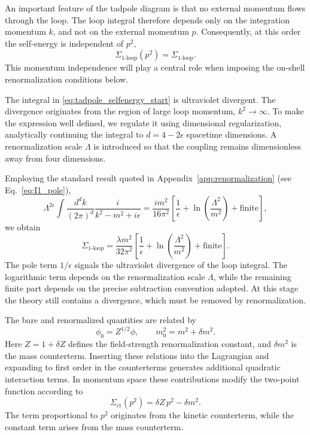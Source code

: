 An important feature of the tadpole diagram is that no external
momentum flows through the loop.
The loop integral therefore depends only on the integration momentum $k$,
and not on the external momentum $p$.
Consequently, at this order the self-energy is independent of $p^2$,
\begin{equation}
\Sigma_{\text{1-loop}}(p^2) = \Sigma_{\text{1-loop}} .
\end{equation}
This momentum independence will play a central role when imposing the
on-shell renormalization conditions below.

The integral in \eqref{eq:tadpole_selfenergy_start} is ultraviolet
divergent.
The divergence originates from the region of large loop momentum,
$k^2 \to \infty$.
To make the expression well defined, we regulate it using dimensional
regularization, analytically continuing the integral to
$d=4-2\epsilon$ spacetime dimensions.
A renormalization scale $\Lambda$ is introduced so that the coupling
remains dimensionless away from four dimensions.

Employing the standard result quoted in
Appendix~\ref{app:renormalization} (see Eq.~\eqref{eq:I1_pole}),
\begin{equation}
\Lambda^{2\epsilon}
\int\!\frac{d^dk}{(2\pi)^d}
\frac{i}{k^2 - m^2 + i\epsilon}
=
\frac{i m^2}{16\pi^2}
\left[
\frac{1}{\epsilon}
+ \ln\!\left(\frac{\Lambda^2}{m^2}\right)
+ \text{finite}
\right],
\end{equation}
we obtain
\begin{equation}
\Sigma_{\text{1-loop}}
=
\frac{\lambda m^2}{32\pi^2}
\left[
\frac{1}{\epsilon}
+ \ln\!\left(\frac{\Lambda^2}{m^2}\right)
+ \text{finite}
\right].
\end{equation}
The pole term $1/\epsilon$ signals the ultraviolet divergence of the
loop integral.
The logarithmic term depends on the renormalization scale $\Lambda$,
while the remaining finite part depends on the precise subtraction
convention adopted.
At this stage the theory still contains a divergence, which must be
removed by renormalization.

The bare and renormalized quantities are related by
\begin{equation}
\phi_0 = Z^{1/2}\phi,
\qquad
m_0^2 = m^2 + \delta m^2.
\end{equation}
Here $Z = 1 + \delta Z$ defines the field-strength renormalization
constant, and $\delta m^2$ is the mass counterterm.
Inserting these relations into the Lagrangian and expanding to first
order in the counterterms generates additional quadratic interaction
terms.
In momentum space these contributions modify the two-point function
according to
\begin{equation}
\Sigma_{\text{ct}}(p^2)
=
\delta Z\,p^2
-
\delta m^2.
\label{eq:selfenergy_counterterm_stripped}
\end{equation}
The term proportional to $p^2$ originates from the kinetic
counterterm, while the constant term arises from the mass
counterterm.


